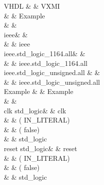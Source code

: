 \ifplastex
\begin{VHDLcode}[\scriptsize]
\else
\begin{VHDLlongcode}[\scriptsize]
\fi
  \hline
  VHDL & & VXMI \\
  \hline
  & &  Example  \\%
  & & \VHDLTab {} \\ %

  \VHDLLIBRARY{} ieee\VHDLSemicolon & & %
  \VHDLTab \VHDLTab {} \\ %
  & & \VHDLTab \VHDLTab \VHDLTab {} ieee \\%

  \VHDLUSE{} ieee.std\_logic\_1164.all\VHDLSemicolon & & %
  \VHDLTab \VHDLTab {} \\ %
  & & \VHDLTab \VHDLTab \VHDLTab {}  ieee.std\_logic\_1164.all \\ %

  \VHDLUSE{} ieee.std\_logic\_unsigned.all \VHDLSemicolon & & %
  \VHDLTab \VHDLTab {} \\ %
  & & \VHDLTab \VHDLTab \VHDLTab {} 
  ieee.std\_logic\_unsigned.all \\ %

  \VHDLENTITY{} Example \VHDLIS{} & & %
  \VHDLTab \VHDLTab {} Example \\

   \VHDLTab \VHDLPORT{} \VHDLOpenBracket & & %
   \VHDLTab \VHDLTab \VHDLTab {} \\

   \VHDLTab \VHDLTab clk \VHDLColon{} \VHDLIN{} std\_logic\VHDLSemicolon  & & %
   \VHDLTab \VHDLTab \VHDLTab \VHDLTab {} clk \\
   & & \VHDLTab \VHDLTab \VHDLTab \VHDLTab \VHDLTab ( IN\_LITERAL)\\
   & & \VHDLTab \VHDLTab \VHDLTab \VHDLTab \VHDLTab ( false)\\
   & & \VHDLTab \VHDLTab \VHDLTab \VHDLTab \VHDLTab {} std\_logic \\

   \VHDLTab \VHDLTab reset \VHDLColon{} \VHDLIN{} std\_logic\VHDLSemicolon & & %
   \VHDLTab \VHDLTab \VHDLTab \VHDLTab {} reset \\
   & & \VHDLTab \VHDLTab \VHDLTab \VHDLTab \VHDLTab ( IN\_LITERAL)\\
   & & \VHDLTab \VHDLTab \VHDLTab \VHDLTab \VHDLTab ( false)\\
   & & \VHDLTab \VHDLTab \VHDLTab \VHDLTab \VHDLTab {} std\_logic \\


\end{VHDLlongcode}
\end{VHDLcode}
